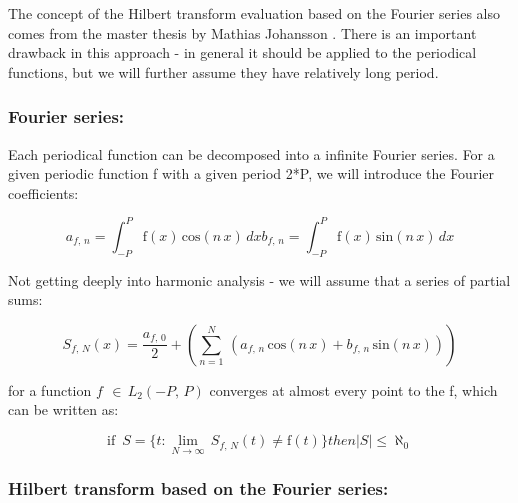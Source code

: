 \documentclass[12pt,twoside,a4paper]{article}
\numberwithin{equation}{subsection}
\numberwithin{figure}{subsection}
\begin{document}
The concept of the Hilbert transform evaluation based on the Fourier series also comes from the master thesis by Mathias Johansson
\cite{johansson_hilbert}. There is an important drawback in this approach - in general it should be applied to the periodical
functions, but we will further assume they have relatively long period. 

\subsubsection*{Fourier series:} 

Each periodical function can be decomposed into a infinite Fourier series. For a given periodic function f with a given period 2*P,
we will introduce the Fourier coefficients:

\begin{subequations} \label{eq:fourier_coeffs}
  \begin{equation}   \label{eq:fcoeffs_an}
    {a_{f, \,n}}=\int_{ - P}^{P}\mathrm{f}(x)\,\mathrm{cos}(n\,x)\, dx
  \end{equation}
  \begin{equation}   \label{eq:fcoeffs_bn}
    {b_{f, \,n}}=\int_{ - P}^{P}\mathrm{f}(x)\,\mathrm{sin}(n\,x)\, dx
  \end{equation}
\end{subequations}

Not getting deeply into harmonic analysis - we will assume that a series of partial sums:

\begin{equation} \label{eq:fourier_partialsums}
  {S_{f, \,N}}(x)=\frac {{a_{f, \,0}}}{2} + (\sum_{n=1}^{N}\,({a
_{f, \,n}}\,\mathrm{cos}(n\,x) + {b_{f, \,n}}\,\mathrm{sin}(n\,x)
))
\end{equation}

for a function $f\,\ \in \,{L_{2}}( - P, \,P)$ converges at almost every point to the f, which can be written as:

\begin{equation} \label{eq:fourier_canbewritten}
  \mbox{if }\,S = \{t : \lim_{N\rightarrow \infty }\,{S_{f, \,N}}(t) \neq \mathrm{f}(t) \} then |S| \leq {\aleph_{0}}
\end{equation}

\subsubsection*{Hilbert transform based on the Fourier series:}
\end{document}
